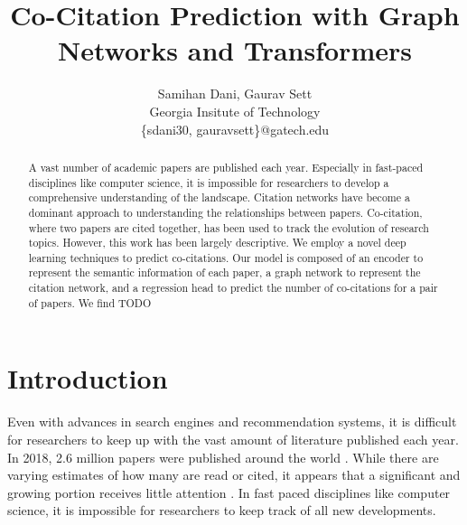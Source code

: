 \documentclass[10pt,twocolumn,letterpaper]{article}
\begin{document}
\title{Co-Citation Prediction with Graph Networks and Transformers}

\author{Samihan Dani, Gaurav Sett\\
Georgia Insitute of Technology\\
\{sdani30, gauravsett\}@gatech.edu
}
\maketitle


\begin{abstract}
   A vast number of academic papers are published each year. Especially in fast-paced disciplines like computer science, it is impossible for researchers to develop a comprehensive understanding of the landscape. 
   Citation networks have become a dominant approach to understanding the relationships between papers. Co-citation, where two papers are cited together, has been used to track the evolution of research topics. However, this work has been largely descriptive.
   We employ a novel deep learning techniques to predict co-citations.
   Our model is composed of an encoder to represent the semantic information of each paper, a graph network to represent the citation network, and a regression head to predict the number of co-citations for a pair of papers.
   We find {TODO}
\end{abstract}


\section{Introduction}
\label{sec:intro}

Even with advances in search engines and recommendation systems, it is difficult for researchers to keep up with the vast amount of literature published each year. In 2018, 2.6 million papers were published around the world \cite{white2019publications}. While there are varying estimates of how many are read or cited, it appears that a significant and growing portion receives little attention \cite{evans2008electronic}. In fast paced disciplines like computer science, it is impossible for researchers to keep track of all new developments. 
\end{document}
